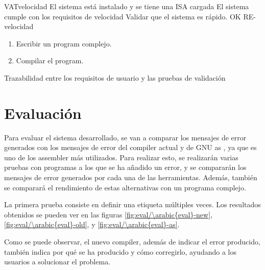 \begin{testCase}{VAT}{velocidad}
    {El sistema está instalado y se tiene una \gls{ISA} cargada} %
    {El sistema cumple con los requisitos de velocidad} %
    {Validar que el sistema es rápido.} %
    {OK} %
    {RE-velocidad} %
    \begin{enumerate}[leftmargin=*, topsep=0pt, noitemsep] %
        \item Escribir un \gls{program} complejo.
        \item Compilar el \gls{program}.
    \end{enumerate}
\end{testCase}

\begin{landscape}
        {Trazabilidad entre los requisitos de usuario y las pruebas de validación}
\end{landscape}

\FloatBarrier

\section{Evaluación}\label{sec:evaluation}

\setcounter{eval}{1}

\newcommand{\evalres}{
    \graphicfigurehere[0.55]{eval/\arabic{eval}-new}{Evaluación \arabic{eval} - Compilador nuevo}
    \graphicfigurehere[0.55]{eval/\arabic{eval}-old}{Evaluación \arabic{eval} - Compilador actual}
    \graphicfigurehere[0.55]{eval/\arabic{eval}-as}{Evaluación \arabic{eval} - GNU as}
    \stepcounter{eval}
}

\newcommand{\evalresref}{
    Los resultados obtenidos se pueden ver en las figuras
    \ref{fig:eval/\arabic{eval}-new}, \ref{fig:eval/\arabic{eval}-old},
    y \ref{fig:eval/\arabic{eval}-as}.
}

Para evaluar el sistema desarrollado, se van a comparar los mensajes de error
generados con los mensajes de error del \gls{compiler} actual y de GNU as
\parencite{GNUas}, ya que es uno de los \gls{assembler} más utilizados. Para
realizar esto, se realizarán varias pruebas con programas a los que se ha
añadido un error, y se compararán los mensajes de error generados por cada una
de las herramientas. Además, también se comparará el rendimiento de estas
alternativas con un programa complejo.

La primera prueba consiste en definir una etiqueta múltiples veces. \evalresref
Como se puede observar, el nuevo \gls{compiler}, además de indicar el error
producido, también indica por qué se ha producido y cómo corregirlo, ayudando a
los usuarios a solucionar el problema.

